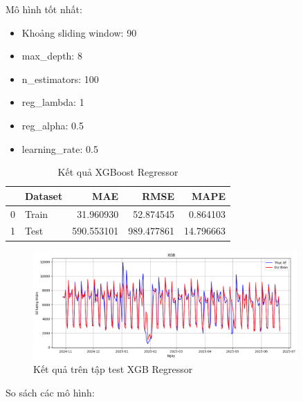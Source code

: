 \begin{itemize}
            Mô hình tốt nhất:
            \begin{itemize}
                \item Khoảng sliding window: 90
                \item max\_depth: 8
                \item n\_estimators: 100
                \item reg\_lambda: 1
                \item reg\_alpha: 0.5
                \item learning\_rate: 0.5
            \end{itemize}

            \begin{table}[htbp]
                \centering
                \caption{Kết quả XGBoost Regressor}
                \label{tab:yte-sl-xgb}
                \begin{tabular}{llrrr}
                \hline
                 & Dataset & MAE & RMSE & MAPE \\
                \hline
                0 & Train & 31.960930 & 52.874545 & 0.864103 \\
                1 & Test & 590.553101 & 989.477861 & 14.796663 \\
                \hline
                \end{tabular}
            \end{table}

            \FloatBarrier

            \begin{figure}[htp]
                \centering
                \includegraphics[width=0.90\textwidth]{images/TS_yte_pred_cmp_XGB.png}
                \caption{Kết quả trên tập test XGB Regressor}
                \label{fig:TS_yte_pred_cmp_XGB}
            \end{figure}
            \FloatBarrier
    \end{itemize}

    So sách các mô hình:

